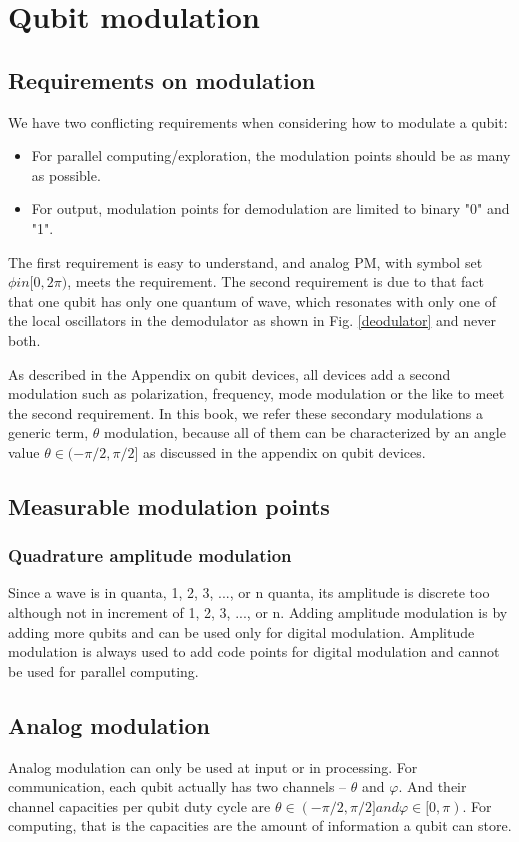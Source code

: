 \documentclass{book}
\begin{document}
\section{Qubit modulation}
\subsection{Requirements on modulation}
We have two conflicting requirements when considering how to modulate a qubit:
\begin{itemize}
    \item For parallel computing/exploration, the modulation points should be as many as possible.
    \item For output, modulation points for demodulation are limited to binary "0" and "1".
\end{itemize}

The first requirement is easy to understand, and analog PM, with symbol set $\phi in [0, 2\pi)$, meets the requirement. The second requirement is due to that fact that one qubit has only one quantum of wave, which resonates with only one of the local oscillators in the demodulator as shown in Fig. \ref{deodulator} and never both.

As described in the Appendix on qubit devices, all devices add a second modulation such as polarization, frequency, mode modulation or the like to meet the second requirement. In this book, we refer these secondary modulations a generic term, $\theta$ modulation, because all of them can be characterized by an angle value $\theta \in (-\pi/2, \pi/2]$ as discussed in the appendix on qubit devices.

\subsection{Measurable modulation points}
\subsubsection{Quadrature amplitude modulation}
Since a wave is in quanta, 1, 2, 3, ..., or n quanta, its amplitude is discrete too although not in increment of 1, 2, 3, ..., or n. Adding amplitude modulation is by adding more qubits and can be used only for digital modulation. Amplitude modulation is always used to add code points for digital modulation and cannot be used for parallel computing.

\subsection{Analog modulation}
Analog modulation can only be used at input or in processing. For communication, each qubit actually has two channels -- $\theta$ and $\varphi$. And their channel capacities per qubit duty cycle are $\theta \in (-\pi/2, \pi/2] and \varphi \in [0, \pi)$. For computing, that is the capacities are the amount of information a qubit can store.
\end{document}
